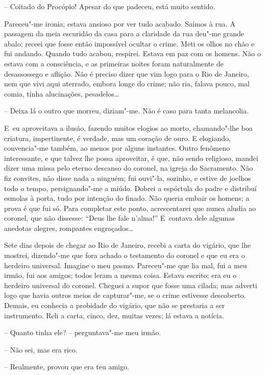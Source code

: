 -- Coitado do Procópio! Apesar do que padeceu, está muito sentido.

Pareceu"-me ironia; estava ansioso por ver tudo acabado. Saímos à rua. A
passagem da meia escuridão da casa para a claridade da rua deu"-me grande
abalo; receei que fosse então impossível ocultar o crime. Meti os olhos
no chão e fui andando. Quando tudo acabou, respirei. Estava em paz com
os homens. Não o estava com a consciência, e as primeiras noites foram
naturalmente de desassossego e aflição. Não é preciso dizer que vim logo
para o Rio de Janeiro, nem que vivi aqui aterrado, embora longe do
crime; não ria, falava pouco, mal comia, tinha alucinações, pesadelos\ldots{}

-- Deixa lá o outro que morreu, diziam"-me. Não é caso para tanta
melancolia.

E~eu aproveitava a ilusão, fazendo muitos elogios ao morto, chamando"-lhe
boa criatura, impertinente, é verdade, mas um coração de ouro. E
elogiando, convencia"-me também, ao menos por alguns instantes. Outro
fenômeno interessante, e que talvez lhe possa aproveitar, é que, não
sendo religioso, mandei dizer uma missa pelo eterno descanso do coronel,
na igreja do Sacramento. Não fiz convites, não disse nada a ninguém; fui
ouvi"-la, sozinho, e estive de joelhos todo o tempo, persignando"-me a
miúdo. Dobrei a espórtula do padre e distribuí esmolas à porta, tudo por
intenção do finado. Não queria embair os homens; a prova é que fui só.
Para completar este ponto, acrescentarei que nunca aludia ao coronel,
que não dissesse: ``Deus lhe fale n'alma!'' E~contava dele algumas
anedotas alegres, rompantes engraçados\ldots{}

Sete dias depois de chegar ao Rio de Janeiro, recebi a carta do vigário,
que lhe mostrei, dizendo"-me que fora achado o testamento do coronel e
que eu era o herdeiro universal. Imagine o meu pasmo. Pareceu"-me que lia
mal, fui a meu irmão, fui aos amigos; todos leram a mesma coisa. Estava
escrito; era eu o herdeiro universal do coronel. Cheguei a supor que
fosse uma cilada; mas adverti logo que havia outros meios de
capturar"-me, se o crime estivesse descoberto. Demais, eu conhecia a
probidade do vigário, que não se prestaria a ser instrumento. Reli a
carta, cinco, dez, muitas vezes; lá estava a notícia.

-- Quanto tinha ele? -- perguntava"-me meu irmão.

-- Não sei, mas era rico.

-- Realmente, provou que era teu amigo.


